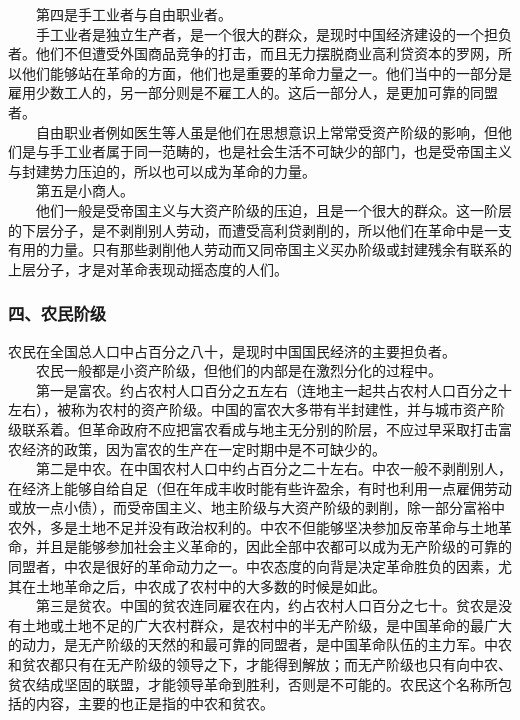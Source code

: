 \documentclass[cn,11pt,chinese]{elegantbook}
\def\myformat#1{\hfil\hfil #1}
\begin{document}
　　第四是手工业者与自由职业者。\\
　　手工业者是独立生产者，是一个很大的群众，是现时中国经济建设的一个担负者。他们不但遭受外国商品竞争的打击，而且无力摆脱商业高利贷资本的罗网，所以他们能够站在革命的方面，他们也是重要的革命力量之一。他们当中的一部分是雇用少数工人的，另一部分则是不雇工人的。这后一部分人，是更加可靠的同盟者。\\
　　自由职业者例如医生等人虽是他们在思想意识上常常受资产阶级的影响，但他们是与手工业者属于同一范畴的，也是社会生活不可缺少的部门，也是受帝国主义与封建势力压迫的，所以也可以成为革命的力量。\\
　　第五是小商人。\\
　　他们一般是受帝国主义与大资产阶级的压迫，且是一个很大的群众。这一阶层的下层分子，是不剥削别人劳动，而遭受高利贷剥削的，所以他们在革命中是一支有用的力量。只有那些剥削他人劳动而又同帝国主义买办阶级或封建残余有联系的上层分子，才是对革命表现动摇态度的人们。\\
\subsubsection*{\myformat{四、农民阶级}}
农民在全国总人口中占百分之八十，是现时中国国民经济的主要担负者。\\
　　农民一般都是小资产阶级，但他们的内部是在激烈分化的过程中。\\
　　第一是富农。约占农村人口百分之五左右（连地主一起共占农村人口百分之十左右），被称为农村的资产阶级。中国的富农大多带有半封建性，并与城市资产阶级联系着。但革命政府不应把富农看成与地主无分别的阶层，不应过早采取打击富农经济的政策，因为富农的生产在一定时期中是不可缺少的。\\
　　第二是中农。在中国农村人口中约占百分之二十左右。中农一般不剥削别人，在经济上能够自给自足（但在年成丰收时能有些许盈余，有时也利用一点雇佣劳动或放一点小债），而受帝国主义、地主阶级与大资产阶级的剥削，除一部分富裕中农外，多是土地不足并没有政治权利的。中农不但能够坚决参加反帝革命与土地革命，并且是能够参加社会主义革命的，因此全部中农都可以成为无产阶级的可靠的同盟者，中农是很好的革命动力之一。中农态度的向背是决定革命胜负的因素，尤其在土地革命之后，中农成了农村中的大多数的时候是如此。\\
　　第三是贫农。中国的贫农连同雇农在内，约占农村人口百分之七十。贫农是没有土地或土地不足的广大农村群众，是农村中的半无产阶级，是中国革命的最广大的动力，是无产阶级的天然的和最可靠的同盟者，是中国革命队伍的主力军。中农和贫农都只有在无产阶级的领导之下，才能得到解放；而无产阶级也只有向中农、贫农结成坚固的联盟，才能领导革命到胜利，否则是不可能的。农民这个名称所包括的内容，主要的也正是指的中农和贫农。\\
\end{document}
